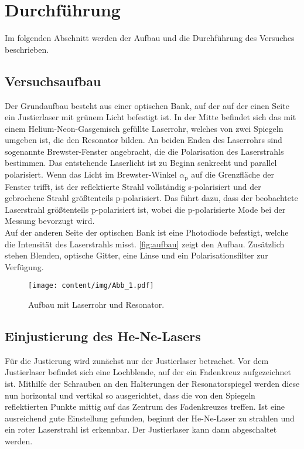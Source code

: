\section{Durchführung}
\label{sec:durchfuehrung}

    Im folgenden Abschnitt werden der Aufbau und die Durchführung des Versuches beschrieben.

\subsection{Versuchsaufbau}
\label{sec:versuchsaufbau}

    Der Grundaufbau besteht aus einer optischen Bank,
    auf der auf der einen Seite ein Justierlaser mit grünem Licht befestigt ist.
    In der Mitte befindet sich das mit einem Helium-Neon-Gasgemisch gefüllte Laserrohr,
    welches von zwei Spiegeln umgeben ist,
    die den Resonator bilden.
    An beiden Enden des Laserrohrs sind sogenannte Brewster-Fenster angebracht,
    die die Polarisation des Laserstrahls bestimmen.
    Das entstehende Laserlicht ist zu Beginn senkrecht und parallel polarisiert.
    Wenn das Licht im Brewster-Winkel $\alpha_\text{p}$ auf die Grenzfläche der Fenster trifft,
    ist der reflektierte Strahl vollständig s-polarisiert und der gebrochene Strahl größtenteils p-polarisiert.
    Das führt dazu,
    dass der beobachtete Laserstrahl größtenteils p-polarisiert ist,
    wobei die p-polarisierte Mode bei der Messung bevorzugt wird.\\
    Auf der anderen Seite der optischen Bank ist eine Photodiode befestigt,
    welche die Intensität des Laserstrahls misst.
    \autoref{fig:aufbau} zeigt den Aufbau.
    Zusätzlich stehen Blenden, optische Gitter, eine Linse und ein Polarisationsfilter zur Verfügung.

    \begin{figure}
      \centering
      \texttt{[image: content/img/Abb\_1.pdf]}
      \caption{Aufbau mit Laserrohr und Resonator.}
      \label{fig:aufbau}
    \end{figure}


\subsection{Einjustierung des He-Ne-Lasers}

    Für die Justierung wird zunächst nur der Justierlaser betrachet.
    Vor dem Justierlaser befindet sich eine Lochblende,
    auf der ein Fadenkreuz aufgezeichnet ist.
    Mithilfe der Schrauben an den Halterungen der Resonatorspiegel werden diese nun horizontal und vertikal so ausgerichtet,
    dass die von den Spiegeln reflektierten Punkte mittig auf das Zentrum des Fadenkreuzes treffen.
    Ist eine ausreichend gute Einstellung gefunden,
    beginnt der He-Ne-Laser zu strahlen
    und ein roter Laserstrahl ist erkennbar.
    Der Justierlaser kann dann abgeschaltet werden.


